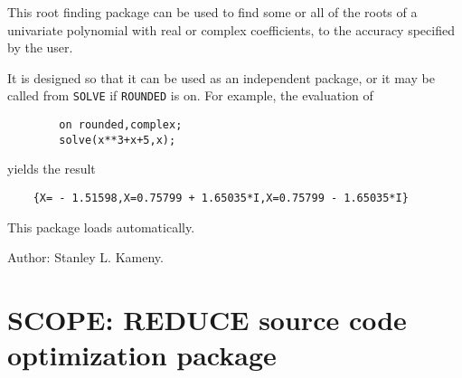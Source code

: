 This root finding package can be used to find some or all of the roots of a
univariate polynomial with real or complex coefficients, to the accuracy
specified by the user.

It is designed so that it can be used as an independent package, or it may
be called from {\tt SOLVE} if {\tt ROUNDED} is on. For example,
the evaluation of
\begin{verbatim}
        on rounded,complex;
        solve(x**3+x+5,x);
\end{verbatim}
yields the result
\begin{verbatim}
    {X= - 1.51598,X=0.75799 + 1.65035*I,X=0.75799 - 1.65035*I}
\end{verbatim}

This package loads automatically.

Author: Stanley L. Kameny.



\newpage
\fi

\iffalse
\section[RSOLVE: Rational/integer polynomial solvers]%
        {RSOLVE: \protect\\ Rational/integer polynomial solvers}

\indexpackage{RSOLVE}

This package provides operators that compute the exact rational zeros
of a single univariate polynomial using fast modular methods.  The
algorithm used is that described by R. Loos (1983): Computing rational
zeros of integral polynomials by $p$-adic expansion, \textit{SIAM J.
Computing}, \textbf{12}, 286--293.

Author: Francis J. Wright.



\newpage
\section{RTRACE: Tracing in \REDUCE}
\indexpackage{RTRACE}

Authors: Herbert Melenk and Francis J. Wright



\newpage
\fi

\section{SCOPE: REDUCE source code optimization package}
\label{SCOPE}

